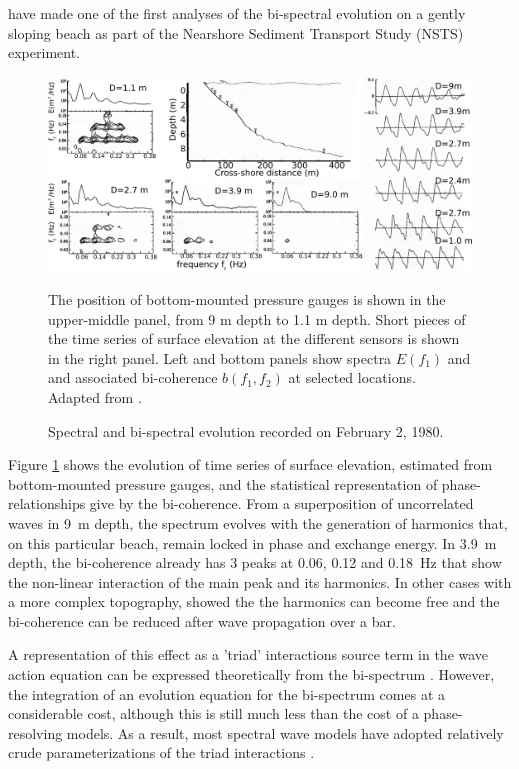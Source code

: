 \cite{Elgar&Guza1985b} have made one of the first analyses of the bi-spectral evolution on a gently sloping beach as part of the 
Nearshore Sediment Transport Study (NSTS) experiment. 
\begin{figure}[htb]
\centerline{\includegraphics[width=\textwidth]{FIGS_CH_SURF/Elgar_Guza_spectra.pdf}}
  \caption{Spectral and bi-spectral evolution recorded on February 2, 1980.}
    {The position of bottom-mounted pressure gauges is shown  in  the upper-middle panel, from 9 m depth to 1.1 m depth. 
    Short pieces of the time series of surface elevation at the different sensors is shown in the right panel. 
    Left and bottom panels show spectra $E(f_1)$ and 
    and associated bi-coherence $b(f_1,f_2)$ at selected locations. Adapted 
    from \cite{Elgar&Guza1985b}.}
\label{fig:NSTS_bispectra}
\end{figure}
Figure \ref{fig:NSTS_bispectra} shows the evolution of time series of surface elevation, estimated from bottom-mounted pressure gauges, 
and the statistical representation of phase-relationships give by the bi-coherence. From a superposition of uncorrelated waves in 9~m depth, 
the spectrum evolves with the generation of harmonics that, on this particular beach, remain locked in phase and exchange energy. 
In 3.9~m depth, the bi-coherence already has 3 peaks at 0.06, 0.12 and 0.18~Hz that show the non-linear interaction of the main peak 
and its harmonics. In other cases with a more complex topography, \cite{Senechal&al.2003} showed the the harmonics can 
become free and the bi-coherence can be reduced after wave propagation over a bar. 

A representation of this 
effect as a  'triad' interactions  source term  in the wave action equation can be expressed theoretically 
from the bi-spectrum \citep{Herbers&Burton1997,Becq1998}. However, the integration of an evolution equation 
for the bi-spectrum comes at a considerable cost, although this is still much less than the cost of a phase-resolving models. 
As a result, most spectral wave models have adopted relatively crude parameterizations of the triad interactions
\citep[e.g.][]{Eldeberky&Battjes1995}. 


